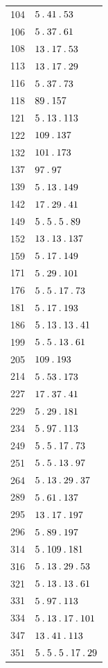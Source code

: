 \begin{longtable}{@{}r|l@{}}
104 & $5\mathbin{.} 41\mathbin{.} 53$\\
106 & $5\mathbin{.} 37\mathbin{.} 61$\\
108 & $13\mathbin{.} 17\mathbin{.} 53$\\
113 & $13\mathbin{.} 17\mathbin{.} 29$\\
116 & $5\mathbin{.} 37\mathbin{.} 73$\\
118 & $89\mathbin{.} 157$\\
121 & $5\mathbin{.} 13\mathbin{.} 113$\\
122 & $109\mathbin{.} 137$\\
132 & $101\mathbin{.} 173$\\
137 & $97\mathbin{.} 97$\\
139 & $5\mathbin{.} 13\mathbin{.} 149$\\
142 & $17\mathbin{.} 29\mathbin{.} 41$\\
149 & $5\mathbin{.} 5\mathbin{.} 5\mathbin{.} 89$\\
152 & $13\mathbin{.} 13\mathbin{.} 137$\\
159 & $5\mathbin{.} 17\mathbin{.} 149$\\
171 & $5\mathbin{.} 29\mathbin{.} 101$\\
176 & $5\mathbin{.} 5\mathbin{.} 17\mathbin{.} 73$\\
181 & $5\mathbin{.} 17\mathbin{.} 193$\\
186 & $5\mathbin{.} 13\mathbin{.} 13\mathbin{.} 41$\\
199 & $5\mathbin{.} 5\mathbin{.} 13\mathbin{.} 61$\\
205 & $109\mathbin{.} 193$\\
214 & $5\mathbin{.} 53\mathbin{.} 173$\\
227 & $17\mathbin{.} 37\mathbin{.} 41$\\
229 & $5\mathbin{.} 29\mathbin{.} 181$\\
234 & $5\mathbin{.} 97\mathbin{.} 113$\\
249 & $5\mathbin{.} 5\mathbin{.} 17\mathbin{.} 73$\\
251 & $5\mathbin{.} 5\mathbin{.} 13\mathbin{.} 97$\\
264 & $5\mathbin{.} 13\mathbin{.} 29\mathbin{.} 37$\\
289 & $5\mathbin{.} 61\mathbin{.} 137$\\
295 & $13\mathbin{.} 17\mathbin{.} 197$\\
296 & $5\mathbin{.} 89\mathbin{.} 197$\\
314 & $5\mathbin{.} 109\mathbin{.} 181$\\
316 & $5\mathbin{.} 13\mathbin{.} 29\mathbin{.} 53$\\
321 & $5\mathbin{.} 13\mathbin{.} 13\mathbin{.} 61$\\
331 & $5\mathbin{.} 97\mathbin{.} 113$\\
334 & $5\mathbin{.} 13\mathbin{.} 17\mathbin{.} 101$\\
347 & $13\mathbin{.} 41\mathbin{.} 113$\\
351 & $5\mathbin{.} 5\mathbin{.} 5\mathbin{.} 17\mathbin{.} 29$\\

\end{longtable}
